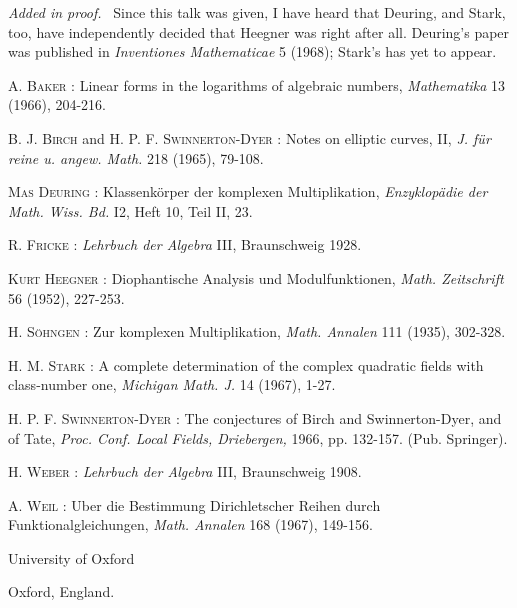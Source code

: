 \medskip
\noindent
{\em Added in proof.}~ Since this talk was given, I have heard that Deuring, and Stark, too, have independently decided that Heegner was right after all. Deuring's paper was published in {\em Inventiones Mathematicae} 5 (1968); Stark's has yet to appear.

\begin{thebibliography}{99}
 \textsc{A. Baker :} Linear forms in the logarithms of algebraic numbers, {\em Mathematika} 13 (1966), 204-216.

 \textsc{B. J. Birch} and \textsc{H. P. F. Swinnerton-Dyer :} Notes on elliptic curves, II, {\em J. f\"ur reine u. angew. Math.} 218 (1965), 79-108.

 \textsc{Mas Deuring :} Klassenk\"orper der komplexen Multiplikation, {\em Enzyklop\"adie der Math. Wiss. Bd.} I2, Heft 10, Teil II, 23.

 \textsc{R. Fricke :} {\em Lehrbuch der Algebra} III, Braunschweig 1928.

 \textsc{Kurt Heegner :} Diophantische Analysis und Modulfunktionen, {\em Math. Zeitschrift} 56 (1952), 227-253.

 \textsc{H. S\"ohngen :} Zur komplexen Multiplikation, {\em Math. Annalen} 111 (1935), 302-328.

 \textsc{H. M. Stark :} A complete determination of the complex quadratic fields with class-number one, {\em Michigan Math. J.} 14 (1967), 1-27.

 \textsc{H. P. F. Swinnerton-Dyer :} The conjectures of Birch and Swinnerton-Dyer, and of Tate, {\em Proc. Conf. Local Fields, Driebergen,} 1966, pp. 132-157. (Pub. Springer).

 \textsc{H. Weber :} {\em Lehrbuch der Algebra} III, Braunschweig 1908.

 \textsc{A. Weil :} Uber die Bestimmung Dirichletscher Reihen durch Funktionalgleichungen, {\em Math. Annalen} 168 (1967), 149-156.
\end{thebibliography}

\bigskip
\noindent
{\small University of Oxford}

\noindent
{\small Oxford, England.}


